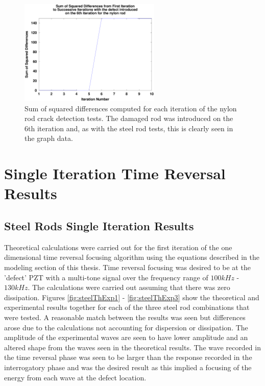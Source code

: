 \begin{figure}[ht!]
\centering
\includegraphics[width=0.6\textwidth]{eps_pics/nylonDifferences}
\caption{Sum of squared differences computed for each iteration of the nylon rod crack detection tests. The damaged rod was introduced on the 6th iteration and, as with the steel rod tests, this is clearly seen in the graph data.
 	 \label{fig:nylonDifferences}} 
\end{figure}

\section{Single Iteration Time Reversal Results}

\subsection{Steel Rods Single Iteration Results}
Theoretical calculations were carried out for the first iteration of the one dimensional time reversal focusing algorithm using the equations described in the modeling section of this thesis. Time reversal focusing was desired to be at the 'defect' PZT with a multi-tone signal over the frequency range of $100 kHz$ - $130 kHz$. The calculations were carried out assuming that there was zero dissipation. Figures \ref{fig:steelThExp1} - \ref{fig:steelThExp3} show the theoretical and experimental results together for each of the three steel rod combinations that were tested. A reasonable match between the results was seen but differences arose due to the calculations not accounting for dispersion or dissipation. The amplitude of the experimental waves are seen to have lower amplitude and an altered shape from the waves seen in the theoretical results. The wave recorded in the time reversal phase was seen to be larger than the response recorded in the interrogatory phase and was the desired result as this implied a focusing of the energy from each wave at the defect location.

